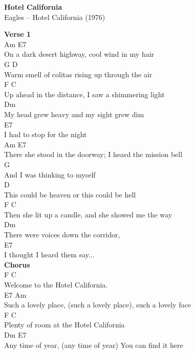 \documentclass[a4paper]{article}
\begin{document}
    \begin{center}
        \textbf{Hotel California}
        ~\\
        Eagles -- Hotel California (1976)
    \end{center}
    {
        \scriptsize
        \textbf{Verse 1}
        ~\\
        {
            \cutive
            \obeyspaces
Am                         E7
\\
  On a dark desert highway, cool wind in my hair
\\
G                      D
\\
  Warm smell of colitas rising up through the air
\\
F                          C
\\
  Up ahead in the distance, I saw a shimmering light
\\
Dm
\\
   My head grew heavy and my sight grew dim
\\
E7
\\
  I had to stop for the night
\\
Am                               E7
\\
  There she stood in the doorway; I heard the mission bell
\\
G
\\
  And I was thinking to myself
\\
              D
\\
This could be heaven or this could be hell
\\
F                          C
\\
  Then she lit up a candle, and she showed me the way
\\
Dm
\\
   There were voices down the corridor,
\\
E7
\\
  I thought I heard them say...
\\

        }
        \textbf{Chorus}
        ~\\
        {
            \cutive
            \obeyspaces
F                          C
\\
  Welcome to the Hotel California.
\\
       E7                                          Am
\\
Such a lovely place, (such a lovely place), such a lovely face
\\
F                               C
\\
Plenty of room at the Hotel California
\\
    Dm                                       E7
\\
Any time of year, (any time of year) You can find it here
\\

}}
\end{document}
